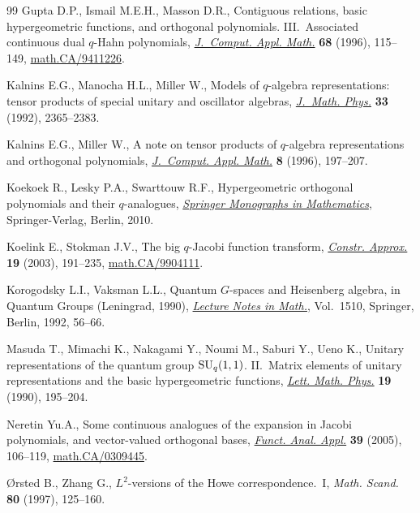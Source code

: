 \documentclass[pdftex]{sigma}
\numberwithin{equation}{section}
\numberwithin{theorem}{section}
\numberwithin{proposition}{section}
\numberwithin{lemma}{section}
\numberwithin{corollary}{section}
\numberwithin{definition}{section}
\numberwithin{example}{section}
\numberwithin{remark}{section}
\numberwithin{note}{section}
\begin{document}
\begin{thebibliography}{99}
Gupta D.P., Ismail M.E.H., Masson D.R.,
Contiguous relations, basic hypergeometric functions, and ortho\-go\-nal polynomials. III.~Associated continuous dual $q$-Hahn polynomials,
\href{http://dx.doi.org/10.1016/0377-0427(95)00264-2}{{\it J.~Comput. Appl. Math.}} \textbf{68} (1996), 115--149,
\href{http://arxiv.org/abs/math.CA/9411226}{math.CA/9411226}.

Kalnins E.G., Manocha H.L., Miller W.,
Models of $q$-algebra representations: tensor products of special unitary and oscillator algebras,
\href{http://dx.doi.org/10.1063/1.529607}{{\it J.~Math. Phys.}} \textbf{33} (1992), 2365--2383.

Kalnins E.G., Miller W.,
A note on tensor products of $q$-algebra representations and orthogonal polynomials,
\href{http://dx.doi.org/10.1016/0377-0427(95)00252-9}{{\it J.~Comput. Appl. Math.}} \textbf{8} (1996),  197--207.

Koekoek R., Lesky P.A., Swarttouw R.F.,
Hypergeometric orthogonal polynomials and their $q$-analogues,
\href{http://dx.doi.org/10.1007/978-3-642-05014-5}{{\it Springer Monographs in Mathematics}}, Springer-Verlag, Berlin, 2010.

Koelink E., Stokman J.V.,
The big $q$-Jacobi function transform,
\href{http://dx.doi.org/10.1007/s00365-002-0498-x}{{\it Constr. Approx.}} \textbf{19} (2003), 191--235,
\href{http://arxiv.org/abs/math.CA/9904111}{math.CA/9904111}.

Korogodsky L.I., Vaksman L.L.,
Quantum $G$-spaces and Heisenberg algebra, in Quantum Groups (Leningrad, 1990),
\href{http://dx.doi.org/10.1007/BFb0101178}{{\it Lecture Notes in Math.}}, Vol.~1510, Springer, Berlin, 1992, 56--66.

Masuda T., Mimachi K., Nakagami Y., Noumi M., Saburi Y., Ueno K.,
Unitary representations of the quantum group ${\rm SU}_q(1,1)$. II.~Matrix elements of unitary representations and the basic hypergeometric functions,
\href{http://dx.doi.org/10.1007/BF01039312}{{\it Lett. Math. Phys.}} {\bf 19} (1990),  195--204.

Neretin Yu.A.,
Some continuous analogues of the expansion in Jacobi polynomials, and vector-valued orthogonal bases,
\href{http://dx.doi.org/10.1007/s10688-005-0023-7}{{\it Funct. Anal. Appl.}} {\bf 39} (2005),  106--119,
\href{http://arxiv.org/abs/math.CA/0309445}{math.CA/0309445}.

{\O}rsted B., Zhang G.,
$L^2$-versions of the Howe correspondence.~I,
{\it Math. Scand.} \textbf{80} (1997),   125--160.


\end{thebibliography}
\end{document}
